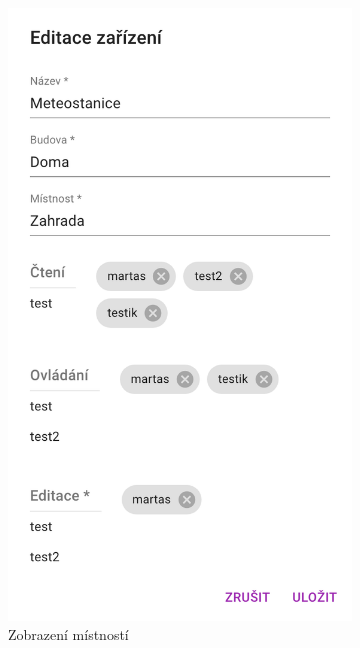 \documentclass[thesis=B,czech]{FITthesis}[2019/12/23]
\begin{document}
\begin{figure}
    \centering
    \begin{subfigure}{.5\textwidth}
        \centering
        \includegraphics[width=.7\linewidth]{img/screens/editDevice.png}
        \caption{Zobrazení místností}
    \end{subfigure}%
    \begin{subfigure}{.5\textwidth}
        \centering

\end{subfigure}
\end{figure}
\end{document}
